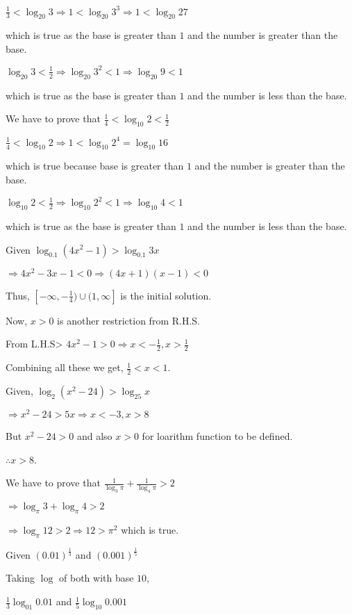   $\frac{1}{3} < \log_{20}3 \Rightarrow 1 < \log_{20}3^3 \Rightarrow 1 < \log_{20}27$

  which is true as the base is greater than $1$ and the number is greater than the base.

  $\log_{20}3 < \frac{1}{2} \Rightarrow \log_{20}3^2 < 1 \Rightarrow \log_{20}9 < 1$

  which is true as the base is greater than $1$ and the number is less than the base.
\item We have to prove that $\frac{1}{4} < \log_{10}2 < \frac{1}{2}$

  $\frac{1}{4} < \log_{10}2 \Rightarrow 1 < \log_{10}2^4 = \log_{10}16$

  which is true because base is greater than $1$ and the number is greater than the base.

  $\log_{10}2 < \frac{1}{2} \Rightarrow \log_{10}2^2 < 1 \Rightarrow \log_{10}4 < 1$

  which is true as the base is greater than $1$ and the number is less than the base.
\item Given $\log_{0.1}(4x^2 - 1) > \log_{0.1}3x$

  $\Rightarrow 4x^2 - 3x - 1 < 0 \Rightarrow (4x + 1)(x - 1) < 0$

  Thus, $[-\infty, -\frac{1}{4})\cup(1, \infty]$ is the initial solution.

  Now, $x > 0$ is another restriction from R.H.S.

  From L.H.S> $4x^2 - 1 > 0 \Rightarrow x < -\frac{1}{2}, x > \frac{1}{2}$

  Combining all these we get, $\frac{1}{2} < x < 1$.
\item Given, $\log_2(x^2 - 24) > \log_25x$

  $\Rightarrow x^2 - 24 > 5x \Rightarrow x < -3, x > 8$

  But $x^2 - 24 > 0$ and also $x > 0$ for loarithm function to be defined.

  $\therefore x > 8$.
\item We have to prove that $\frac{1}{\log_3\pi} + \frac{1}{\log_4\pi} > 2$

  $\Rightarrow \log_{\pi}3 + \log_{\pi}4 > 2$

  $\Rightarrow \log_{\pi}12 > 2 \Rightarrow 12 > \pi^2$ which is true.
\item Given $(0.01)^{\tfrac{1}{3}}$ and $(0.001)^{\tfrac{1}{5}}$

  Taking $\log$ of both with base $10$,

  $\frac{1}{3}\log_{01}0.01$ and $\frac{1}{5}\log_{10}0.001$

